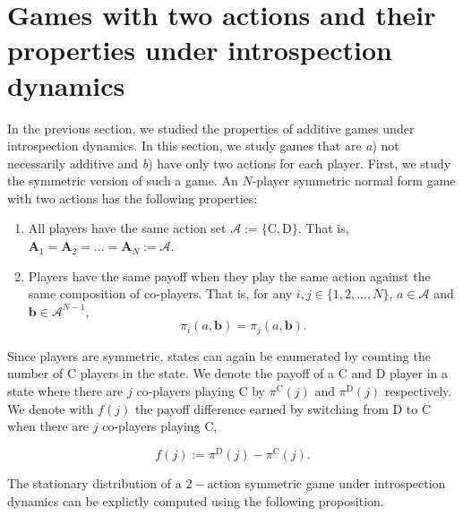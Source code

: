 \documentclass[11pt]{article}
\theoremstyle{plainCl1}
\theoremstyle{plainCl2}
\newcommand{\A}{\mathbf{A}}
\newcommand{\abf}{\mathbf{a}}
\newcommand{\bbf}{\mathbf{b}}
\newcommand{\C}{\mathrm{C}}
\newcommand{\D}{\mathrm{D}}
\begin{document}
\section{Games with two actions and their properties under introspection dynamics}

In the previous section, we studied the properties of additive games under introspection dynamics. In this section, we study games that are\textit{ a}) not necessarily additive and \textit{b}) have only two actions for each player. First, we study the symmetric version of such a game. An $N$-player symmetric normal form game with two actions has the following properties:

\begin{enumerate}
\item  All players have the same action set $\mathcal{A} := \{\C,\D\}$. That is, $\A_1 = \A_2 = ... = \A_N := \mathcal{A}$. 
\item Players have the same payoff when they play the same action against the same composition of co-players. That is, for any $i,j \in \{1,2,...,N\}$, $a \in \mathcal{A}$ and $\bbf \in \mathcal{A}^{N-1}$,
\begin{equation}
\pi_i(a,\bbf) = \pi_j(a,\bbf).
\end{equation} 
\end{enumerate}

\noindent Since players are symmetric, states can again be enumerated by counting the number of $\C$ players in the state. We denote the payoff of a $\C$ and $\D$ player in a state where there are $j$ co-players playing $\C$ by $\pi^\C(j)$ and $\pi^\D(j)$ respectively. We denote with $f(j)$ the payoff difference earned by switching from $\D$ to $\C$ when there are $j$ co-players playing $\C$, 

\begin{equation}
f(j) := \pi^\D(j) - \pi^\C(j).
\label{Eq:f-switching-CtoD}
\end{equation}

%
\noindent The stationary distribution of a $2-$action symmetric game under introspection dynamics can be explictly computed using the following proposition. 
\end{document}
